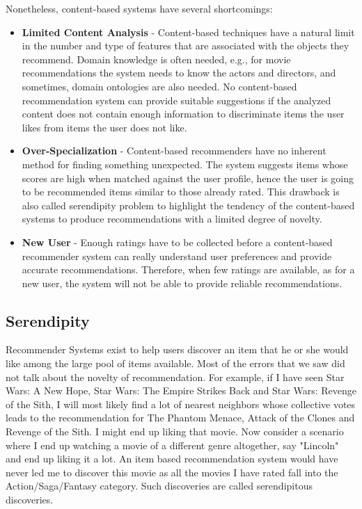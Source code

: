  Nonetheless, content-based systems have several shortcomings:
\begin{itemize}
\item \textbf{Limited Content Analysis} - Content-based techniques have a natural limit in the number and type of features that are associated with the objects they recommend. Domain knowledge is often needed, e.g., for movie recommendations the system needs to know the actors and directors, and sometimes, domain ontologies are also needed. No content-based recommendation system can provide suitable suggestions if the analyzed content does not contain enough information to discriminate items the user likes from items the user does not like.
\end{itemize}
\begin{itemize}
\item \textbf{Over-Specialization} - Content-based recommenders have no inherent method for finding something unexpected. The system suggests items whose scores are high when matched against the user profile, hence the user is going to be recommended items similar to those already rated. This drawback is also called serendipity problem to highlight the tendency of the content-based systems to produce recommendations with a limited degree of novelty.
\end{itemize}
\begin{itemize}
\item \textbf{New User} - Enough ratings have to be collected before a content-based recommender system can really understand user preferences and provide accurate recommendations. Therefore, when few ratings are available, as for a new user, the system will not be able to provide reliable recommendations.
\end{itemize}

  \subsection{Serendipity}
  Recommender Systems exist to help users discover an item that he or she would like among the large pool of items available. Most of the errors that we saw did not talk about the novelty of recommendation. For example, if I have seen Star Wars: A New Hope, Star Wars: The Empire Strikes Back and Star Wars: Revenge of the Sith, I will most likely find a lot of nearest neighbors whose collective votes leads to the recommendation for The Phantom Menace, Attack of the Clones and Revenge of the Sith. I might end up liking that movie. Now consider a scenario where I end up watching a movie of a different genre altogether, say "Lincoln" and end up liking it a lot. An item based recommendation system would have never led me to discover this movie as all the movies I have rated fall into the Action/Saga/Fantasy category. Such discoveries are called serendipitous discoveries. 


